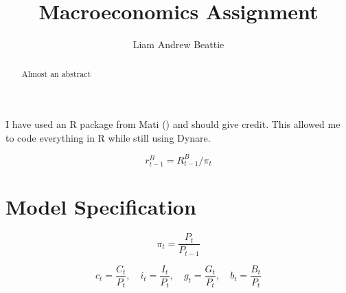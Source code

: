 \documentclass[11pt,preprint]{elsarticle}
\numberwithin{equation}{section}
\numberwithin{figure}{section}
\numberwithin{table}{section}
\begin{document}
\begin{frontmatter}  %

\title{Macroeconomics Assignment}





\author[Add1]{Liam Andrew Beattie}





\address[Add1]{Macroeconomics 871, Stellenbosch University, South
Africa}


\begin{abstract}
\small{
Almost an abstract
}
\end{abstract}

\vspace{1cm}





\vspace{0.5cm}

\end{frontmatter}

\setcounter{footnote}{0}



\pagestyle{fancy}
\chead{}
\rhead{}
\lfoot{}
\lhead{}
\cfoot{}


\headsep 35pt %




I have used an R package from Mati () and
should give credit. This allowed me to code everything in R while still
using Dynare.

\[r^B_{t-1} = R^B_{t-1}/\pi_t\]

\section{Model Specification}\label{model-specification}

\begin{equation}
\pi_t = \frac{P_t}{P_{t-1}}
\label{inflation}
\end{equation}

\begin{equation}
c_t = \frac{C_t}{P_t}, 
\quad i_t = \frac{I_t}{P_t}, 
\quad g_t = \frac{G_t}{P_t},
\quad b_t = \frac{B_t}{P_t}
\label{real_conversions}
\end{equation}
\end{document}
